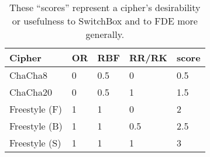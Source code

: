 \begin{table}[]
  \begin{tabular}{@{}lllll@{}}
  \toprule
  \textbf{Cipher} & \textbf{OR} & \textbf{RBF} & \textbf{RR/RK} & \textbf{score} \\ \midrule
  ChaCha8         & 0           & 0.5          & 0              & 0.5            \\
  ChaCha20        & 0           & 0.5          & 1              & 1.5            \\
  Freestyle (F)   & 1           & 1            & 0              & 2              \\
  Freestyle (B)   & 1           & 1            & 0.5            & 2.5            \\
  Freestyle (S)   & 1           & 1            & 1              & 3
  \end{tabular}
  \caption{These ``scores'' represent a cipher's desirability or usefulness to
  SwitchBox and to FDE more generally.}
  \label{tbl:security-quant}
\end{table}
